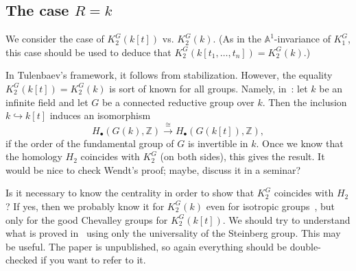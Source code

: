 \documentclass[oneside,12pt]{amsart}
\numberwithin{equation}{section}
\numberwithin{lem}{section}
\theoremstyle{definition}
\theoremstyle{remark}
\newcommand{\Aff}{\mathbb{A}}
\begin{document}
\subsection{The case $R=k$}
We consider the case of $K_2^G(k[t])$ vs. $K_2^G(k)$.
(As in the $\Aff^1$-invariance of $K_1^G$, this case should be used to deduce that $K_2^G(k[t_1,\ldots,t_n])=K_2^G(k)$.)

In Tulenbaev's framework, it follows from stabilization.
However, the equality $K_2^G(k[t])=K_2^G(k)$ is sort of known for all groups.
Namely, in~\cite[Theorem 5.1]{W-k[t]}: let $k$ be an infinite field and let $G$ be a connected reductive
group over $k$. Then the inclusion $k\hookrightarrow k[t]$ induces an
isomorphism
$$H_\bullet(G(k),\mathbb{Z})\stackrel{\cong}{\longrightarrow} H_\bullet(G(k[t]),\mathbb{Z}),$$
if the order of the fundamental group of $G$ is invertible in $k$.
Once we know that the homology $H_2$ coincides with $K_2^G$ (on both sides), this gives the result.
It would be nice to check Wendt's proof; maybe, discuss it in a seminar?

Is it necessary to know the centrality in order to show that $K_2^G$ coincides with $H_2$?
If yes, then we probably know it for $K_2^G(k)$ even for isotropic groups~\cite{Deo}, but only for the good
Chevalley groups for $K_2^G(k[t])$.
We should try to understand what is proved in~\cite[Proposition 5.3]{VW} using only the universality of
the Steinberg group. This may be useful. The paper is unpublished, so again everything should be double-checked
if you want to refer to it.
\end{document}
